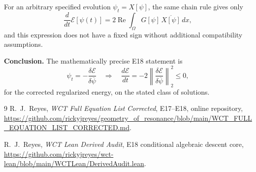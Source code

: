 \documentclass[11pt]{article}
\newcommand{\Om}{\Omega}
\newcommand{\EE}{\mathcal E}
\newcommand{\Rea}{\operatorname{Re}}
\begin{document}
For an arbitrary specified evolution $\psi_t=X[\psi]$, the same
chain rule gives only
\begin{equation}
 \frac{d}{dt}\EE[\psi(t)]
 =2\Rea\int_\Om G[\psi]\,\overline{X[\psi]}\,dx,
\end{equation}
and this expression does not have a fixed sign without additional
compatibility assumptions.

\noindent\textbf{Conclusion.}
The mathematically precise E18 statement is
\begin{equation*}
 \boxed{
 \psi_t=-\frac{\delta\EE}{\delta\overline\psi}
 \quad\Longrightarrow\quad
 \frac{d\EE}{dt}
 =-2\left\|\frac{\delta\EE}{\delta\overline\psi}\right\|_2^2
 \le0,
 }
\end{equation*}
for the corrected regularized energy, on the stated class of solutions.

\begin{thebibliography}{9}
R.~J.~Reyes, \emph{WCT Full Equation List Corrected},
E17--E18, online repository,
\url{https://github.com/rickyjreyes/geometry_of_resonance/blob/main/WCT_FULL_EQUATION_LIST_CORRECTED.md}.

R.~J.~Reyes, \emph{WCT Lean Derived Audit}, E18 conditional
algebraic descent core,
\url{https://github.com/rickyjreyes/wct-lean/blob/main/WCTLean/DerivedAudit.lean}.
\end{thebibliography}
\end{document}
